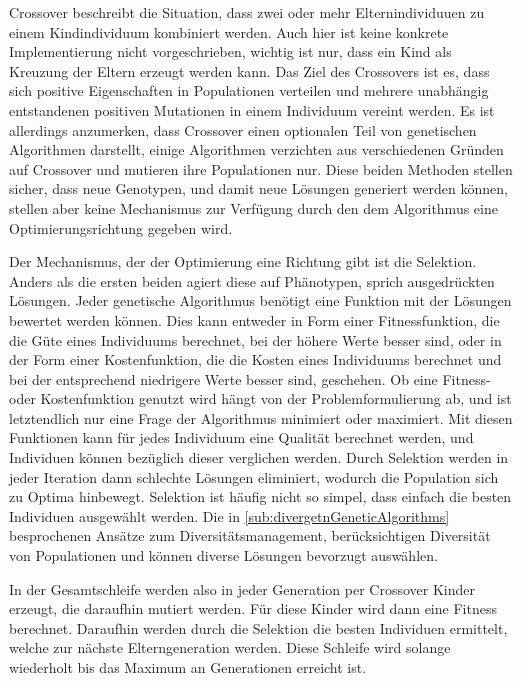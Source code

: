 Crossover beschreibt die Situation, dass zwei oder mehr Elternindividuuen zu einem Kindindividuum kombiniert werden. 
Auch hier ist keine konkrete Implementierung nicht vorgeschrieben, wichtig ist nur, dass ein Kind als Kreuzung der Eltern erzeugt werden kann.
Das Ziel des Crossovers ist es, dass sich positive Eigenschaften in Populationen verteilen und mehrere unabhängig entstandenen positiven Mutationen in einem Individuum vereint werden.
Es ist allerdings anzumerken, dass Crossover einen optionalen Teil von genetischen Algorithmen darstellt, einige Algorithmen%
verzichten aus verschiedenen Gründen auf Crossover und mutieren ihre Populationen nur.
Diese beiden Methoden stellen sicher, dass neue Genotypen, und damit neue Lösungen generiert werden können, stellen aber keine Mechanismus zur Verfügung durch den dem Algorithmus eine Optimierungsrichtung gegeben wird.

Der Mechanismus, der der Optimierung eine Richtung gibt ist die Selektion.
Anders als die ersten beiden agiert diese auf Phänotypen, sprich ausgedrückten Lösungen.
Jeder genetische Algorithmus benötigt eine Funktion mit der Lösungen bewertet werden können.
Dies kann entweder in Form einer Fitnessfunktion, die die Güte eines Individuums berechnet, bei der höhere Werte besser sind, oder in der Form einer Kostenfunktion, die die Kosten eines Individuums berechnet und bei der entsprechend niedrigere Werte besser sind, geschehen.
Ob eine Fitness- oder Kostenfunktion genutzt wird hängt von der Problemformulierung ab, und ist letztendlich nur eine Frage der Algorithmus minimiert oder maximiert.
Mit diesen Funktionen kann für jedes Individuum eine Qualität berechnet werden, und Individuen können bezüglich dieser verglichen werden.
Durch Selektion werden in jeder Iteration dann schlechte Lösungen eliminiert, wodurch die Population sich zu Optima hinbewegt.
Selektion ist häufig nicht so simpel, dass einfach die besten Individuen ausgewählt werden.
Die in \cref{sub:divergetnGeneticAlgorithms} besprochenen Ansätze zum Diversitätsmanagement, berücksichtigen Diversität von Populationen und können diverse Lösungen bevorzugt auswählen.

In der Gesamtschleife werden also in jeder Generation per Crossover Kinder erzeugt, die daraufhin mutiert werden.
Für diese Kinder wird dann eine Fitness berechnet.
Daraufhin werden durch die Selektion die besten Individuen ermittelt, welche zur nächste Elterngeneration werden.
Diese Schleife wird solange wiederholt bis das Maximum an Generationen erreicht ist.

